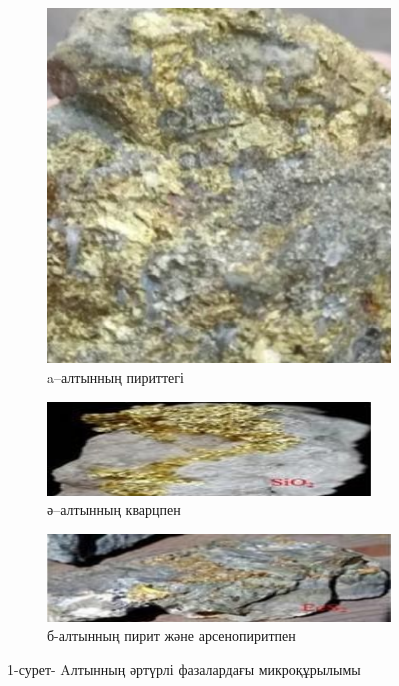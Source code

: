 \begin{figure}[H]
    \centering
    \begin{subfigure}[b]{0.32\textwidth}
        \centering
        \includegraphics[width=\textwidth]{media/gor/image1}
        \caption*{a--алтынның пириттегі}
    \end{subfigure}
    \hfill
    \begin{subfigure}[b]{0.32\textwidth}
        \centering
        \includegraphics[width=\textwidth]{media/gor/image2}
        \caption*{ә--алтынның кварцпен}
    \end{subfigure}
    \hfill
    \begin{subfigure}[b]{0.32\textwidth}
        \centering
        \includegraphics[width=\textwidth]{media/gor/image3}
        \caption*{б-алтынның пирит және арсенопиритпен}
    \end{subfigure}
    \caption*{1-сурет- Aлтынның әртүрлі фазалардағы микроқұрылымы}
\end{figure}



